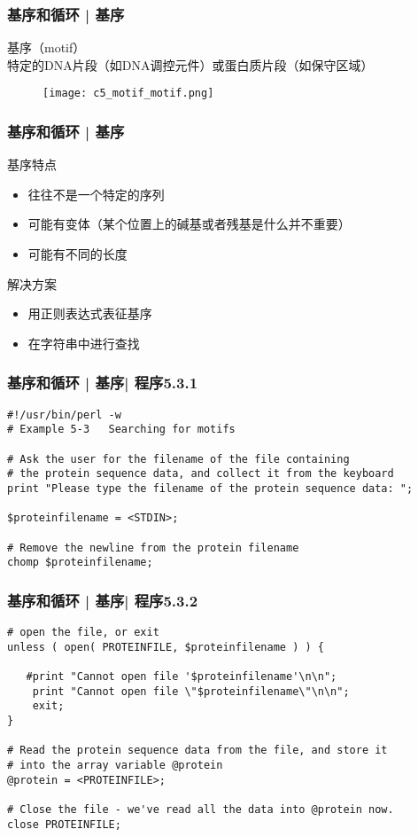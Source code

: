 \begin{frame}
  \frametitle{基序和循环 | 基序}
  \begin{block}{基序（motif）}
    特定的DNA片段（如DNA调控元件）或蛋白质片段（如保守区域）
  \end{block}
  \begin{figure}
    \centering
    \texttt{[image: c5\_motif\_motif.png]}
  \end{figure}
\end{frame}

\begin{frame}
  \frametitle{基序和循环 | 基序}
  \begin{block}{基序特点}
    \begin{itemize}
      \item 往往不是一个特定的序列
      \item 可能有变体（某个位置上的碱基或者残基是什么并不重要）
      \item 可能有不同的长度
    \end{itemize}
  \end{block}
  \pause
  \begin{block}{解决方案}
    \begin{itemize}
      \item 用正则表达式表征基序
      \item 在字符串中进行查找
    \end{itemize}
  \end{block}
\end{frame}

\begin{frame}[fragile]
  \frametitle{基序和循环 | 基序| 程序5.3.1}
\begin{lstlisting}[firstnumber=1]
#!/usr/bin/perl -w
# Example 5-3   Searching for motifs

# Ask the user for the filename of the file containing
# the protein sequence data, and collect it from the keyboard
print "Please type the filename of the protein sequence data: ";

$proteinfilename = <STDIN>;

# Remove the newline from the protein filename
chomp $proteinfilename;
\end{lstlisting}
\end{frame}

\begin{frame}[fragile]
  \frametitle{基序和循环 | 基序| 程序5.3.2}
  \vspace{-0.5em}
\begin{lstlisting}[firstnumber=13,basicstyle=\small\tt]
# open the file, or exit
unless ( open( PROTEINFILE, $proteinfilename ) ) {

   #print "Cannot open file '$proteinfilename'\n\n";
    print "Cannot open file \"$proteinfilename\"\n\n";
    exit;
}

# Read the protein sequence data from the file, and store it
# into the array variable @protein
@protein = <PROTEINFILE>;

# Close the file - we've read all the data into @protein now.
close PROTEINFILE;
\end{lstlisting}
\end{frame}

